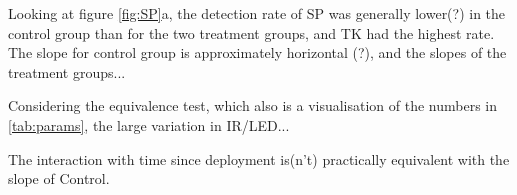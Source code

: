 Looking at figure \ref{fig:SP}a, the detection rate of SP was generally lower(?) in the control group than for the two treatment groups, and TK had the highest rate.
The slope for control group is approximately horizontal (?), and the slopes of the treatment groups...

Considering the equivalence test, which also is a visualisation of the numbers in \ref{tab:params}, the large variation in IR/LED...

The interaction with time since deployment is(n't) practically equivalent with the slope of Control.






